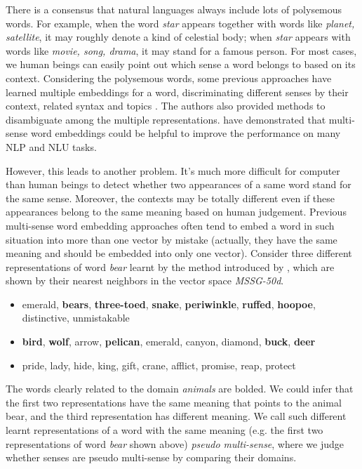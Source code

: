 \documentclass[11pt]{article}
\begin{document}
\par
There is a consensus that natural languages always include lots of polysemous words. For example, when the word {\sl star} appears together with words like {\sl planet, satellite}, it may roughly denote a kind of celestial body; when {\sl star} appears with words like {\sl movie, song, drama}, it may stand for a famous person. For most cases, we human beings can easily point out which sense a word belongs to based on its context. Considering the polysemous words, some previous approaches have learned multiple embeddings for a word, discriminating different senses by their context, related syntax and topics \cite{reisinger2010multi, huang2012improving, chen2014unified, pina2014simple, neelakantan2015efficient, cheng2015syntax, liu2015topical}. The authors also provided methods to disambiguate among the multiple representations.  have demonstrated that multi-sense word embeddings could be helpful to improve the performance on many NLP and NLU tasks.
\par
However, this leads to another problem. It's much more difficult for computer than human beings to detect whether two appearances of a same word stand for the same sense. Moreover, the contexts may be totally different even if these appearances belong to the same meaning based on human judgement. Previous multi-sense word embedding approaches often tend to embed a word in such situation into more than one vector by mistake (actually, they have the same meaning and should be embedded into only one vector). Consider three different representations of word {\sl bear} learnt by the method introduced by , which are shown by their nearest neighbors in the vector space {\sl MSSG-50d}.
\begin{itemize}
\item emerald, \textbf{bears}, \textbf{three-toed}, \textbf{snake}, \textbf{periwinkle}, \textbf{ruffed}, \textbf{hoopoe}, distinctive, unmistakable
\item \textbf{bird}, \textbf{wolf}, arrow, \textbf{pelican}, emerald, canyon, diamond, \textbf{buck}, \textbf{deer}
\item pride, lady, hide, king, gift, crane, afflict, promise, reap, protect
\end{itemize}
The words clearly related to the domain {\sl animals} are bolded. We could infer that the first two representations have the same meaning that points to the animal bear, and the third representation has different meaning. We call such different learnt representations of a word with the same meaning (e.g. the first two representations of word {\sl bear} shown above) {\sl pseudo multi-sense}, where we judge whether senses are pseudo multi-sense by comparing their domains.
\end{document}
